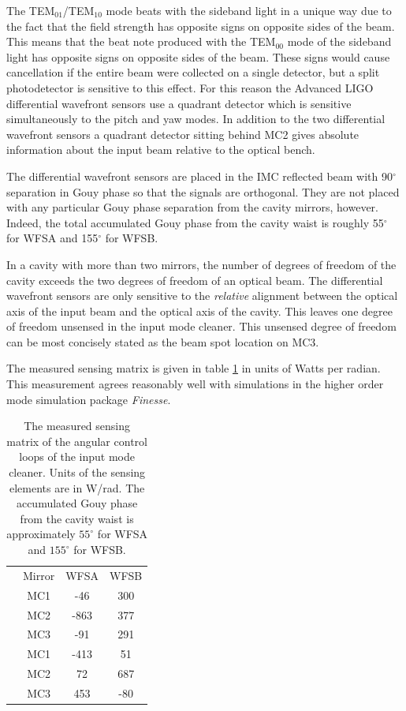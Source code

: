 The TEM$_{01}$/TEM$_{10}$ mode beats with the sideband light in a unique way due to the 
fact that the field strength has opposite signs on opposite sides of the beam.  
This means that the beat note produced with the TEM$_{00}$ mode of the sideband light 
has opposite signs on opposite sides of the beam.  
These signs would cause cancellation if the entire beam were collected on a 
single detector, but a split photodetector is sensitive to this effect.  
For this reason the Advanced LIGO differential wavefront sensors use a quadrant detector 
which is sensitive simultaneously to the pitch and yaw modes.
In addition to the two differential wavefront sensors a quadrant detector sitting 
behind MC2 gives absolute information about the input beam relative to the optical bench.

The differential wavefront sensors are placed in the IMC reflected beam with 
90$^\circ$ separation in Gouy phase so that the signals are orthogonal.  
They are not placed with any particular Gouy phase separation from the cavity mirrors, 
however.  
Indeed, the total accumulated Gouy phase from the cavity waist is 
roughly 55$^\circ$ for WFSA and 155$^\circ$ for WFSB.

In a cavity with more than two mirrors, the number of degrees of freedom of the cavity 
exceeds the two degrees of freedom of an optical beam.  
The differential wavefront sensors are only sensitive to the \emph{relative} alignment 
between the optical axis of the input beam and the optical axis of the cavity.  
This leaves one degree of freedom unsensed in the input mode cleaner.  
This unsensed degree of freedom can be most concisely stated as the beam spot location 
on MC3.  

The measured sensing matrix is given in table \ref{tab:SensingMatrix} in units of 
Watts per radian.  
This measurement agrees reasonably well with simulations in the higher order mode 
simulation package \emph{Finesse}\cite{finesse}\cite{ligo_T1100338}.  

\begin{table}
	\centering
	\begin{tabular}{|c||c|c|c|}
		\hline
		{} & Mirror & WFSA & WFSB\\
		\hhline{|=#=|=|=|}
		\multirow{3}{*}{Pitch} & MC1 & -46 & 300 \\
		\hhline{~---}
		  & MC2 & -863 & 377 \\
		\hhline{~---}
		  & MC3 & -91  & 291 \\
		\hhline{|=#=|=|=|}
		\multirow{3}{*}{Yaw} & MC1 & -413 & 51 \\
		\hhline{~---}
		  & MC2 & 72  & 687 \\
		\hhline{~---}
		  & MC3 & 453 & -80 \\
		\hline
	\end{tabular}
	\caption{The measured sensing matrix of the angular control loops of the input mode cleaner. 
		Units of the sensing elements are in W/rad.  
		The accumulated Gouy phase from the cavity waist is approximately $55^\circ$ for WFSA and 
		$155^\circ$ for WFSB.}
	\label{tab:SensingMatrix}	
\end{table}

